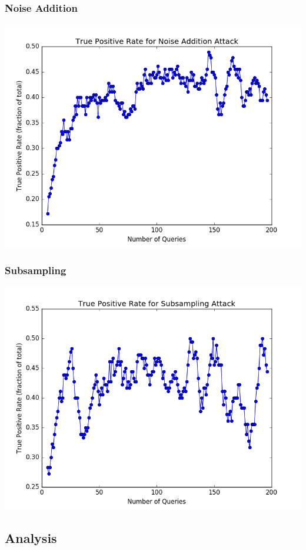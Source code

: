 \documentclass[12pt]{article}
\begin{document}
\subsubsection{Noise Addition}
\includegraphics[scale=0.6]{figures/problem_3_noise_addition_true_positive_rate.png}

\subsubsection{Subsampling}
\includegraphics[scale=0.6]{figures/problem_3_subsampling_true_positive_rate.png}

\newpage

\subsection{Analysis} 
\end{document}

